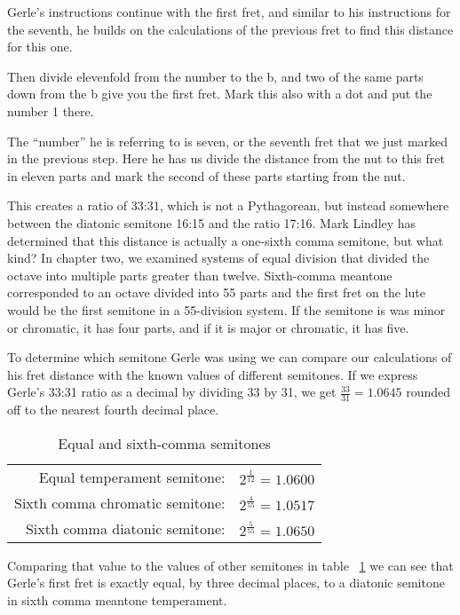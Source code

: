 Gerle's instructions continue with the first fret, and similar to his
instructions for the seventh, he builds on the calculations of the previous fret
to find this distance for this one.
\begin{blocks}
Then divide elevenfold from the number to the b, and two of the same parts down
from the b give you the first fret.  Mark this also with a dot and put the
number 1 there.
\end{blocks}
The ``number'' he is referring to is seven, or the seventh fret that we just marked
in the previous step.  Here he has us divide the distance from the nut to this
fret in eleven parts and mark the second of these parts starting from the nut.

This creates a ratio of 33:31, which is not a Pythagorean, but instead somewhere between the diatonic
semitone 16:15 and the ratio 17:16. Mark Lindley has determined that this distance is actually
a one-sixth comma semitone, but what kind?  In chapter two, we examined systems of equal division that divided
the octave into multiple
parts greater than twelve.  Sixth-comma meantone corresponded to an octave
divided into 55 parts and the first fret on the lute would be the first semitone
in a 55-division system.  If the semitone is was minor or chromatic, it has four parts, and
if it is major or chromatic, it has five.

To determine which semitone Gerle was using
we can compare our calculations of his fret distance with the known
values of different semitones.  If we express Gerle's 33:31 ratio as a decimal by dividing 33 by 31,
we get $ \frac{33}{31} = 1.0645 $ rounded off
to the nearest fourth decimal place.
\begin{table}[h!]
    \begin{center}
    \begin{tabular}{ r l }
        Equal temperament semitone:     & $ 2^\frac{1}{12} = 1.0600 $ \\
        Sixth comma chromatic semitone: & $ 2^\frac{4}{55} = 1.0517 $ \\
        Sixth comma diatonic semitone:  & $ 2^\frac{5}{55} = 1.0650 $ \\
    \end{tabular}
    \end{center}
    \caption{Equal and sixth-comma semitones}
    \label{table:6semitones}
\end{table}
Comparing that value to the values of
other semitones in table ~\ref{table:6semitones} we can see that Gerle's
first fret is exactly equal, by three decimal places,
to a diatonic semitone in sixth comma meantone temperament.

